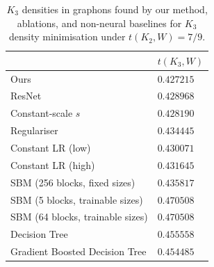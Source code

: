 \documentclass{article}
\theoremstyle{plain}
\theoremstyle{definition}
\theoremstyle{remark}
\begin{document}
\begin{table}[t]
  \centering
  \caption{$K_3$ densities in graphons found by our method, ablations, and non-neural baselines for $K_3$ density minimisation under $t(K_2, W)=7/9$.  \label{tab:ablationstudy}}
  {\small
  \begin{tabular}{ll}
  \toprule
                     & $t(K_3, W)$ \\
  \midrule
  Ours                                     & $0.427215$ \\
  ResNet                                   & $0.428968$ \\
  Constant-scale $s$                       & $0.428190$ \\
  Regulariser                              & $0.434445$ \\
  Constant LR (low)                        & $0.430071$ \\
  Constant LR (high)                       & $0.431645$ \\
  \midrule
  SBM (256 blocks, fixed sizes)            & $0.435817$ \\
  SBM (5 blocks, trainable sizes)          & $0.470508$ \\
  SBM (64 blocks, trainable sizes)         & $0.470508$ \\
  Decision Tree                            & $0.455558$ \\
  Gradient Boosted Decision Tree           & $0.454485$ \\
  \bottomrule
  \end{tabular}
  }
\end{table}
\end{document}
